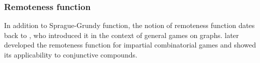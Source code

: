 \documentclass[review]{elsarticle}
\begin{document}
%

\subsubsection{Remoteness function}
In addition to Sprague-Grundy function, the notion of remoteness function dates back to \cite{Ste1925}, who introduced it in the context of general games on graphs. 
\citet{Smith1966} later developed the remoteness function for impartial combinatorial games and showed its applicability to conjunctive compounds.
\end{document}
